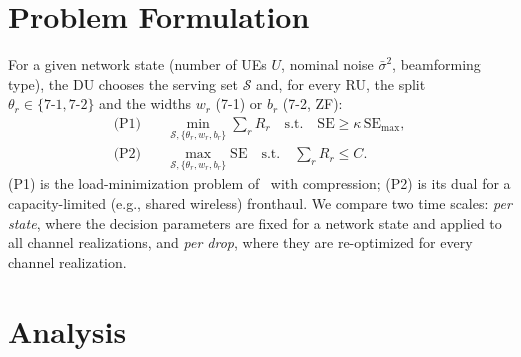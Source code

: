 \documentclass[10pt, final, journal, letterpaper, twocolumn]{IEEEtran}
\begin{document}
\section{Problem Formulation}
\label{sec:problem}

For a given network state (number of UEs $U$, nominal noise $\bar\sigma^2$, beamforming type), the DU chooses the serving set $\mathcal{S}$ and, for every RU, the split $\theta_r\in\{7\text{-}1,7\text{-}2\}$ and the widths $w_r$ (7-1) or $b_r$ (7-2, ZF):
\begin{align}
  \text{(P1)}\quad &\min_{\mathcal{S},\{\theta_r,w_r,b_r\}} \sum_r R_r \quad \text{s.t.}\quad \mathrm{SE} \ge \kappa\,\mathrm{SE}_{\max}, \label{eq:p1}\\
  \text{(P2)}\quad &\max_{\mathcal{S},\{\theta_r,w_r,b_r\}} \mathrm{SE} \quad \text{s.t.}\quad \sum_r R_r \le C . \label{eq:p2}
\end{align}
(P1) is the load-minimization problem of~\cite{girycki2024eucnc} with compression; (P2) is its dual for a capacity-limited (e.g., shared wireless) fronthaul. We compare two time scales: \emph{per state}, where the decision parameters are fixed for a network state and applied to all channel realizations, and \emph{per drop}, where they are re-optimized for every channel realization.

\section{Analysis}
\label{sec:analysis}
\end{document}
